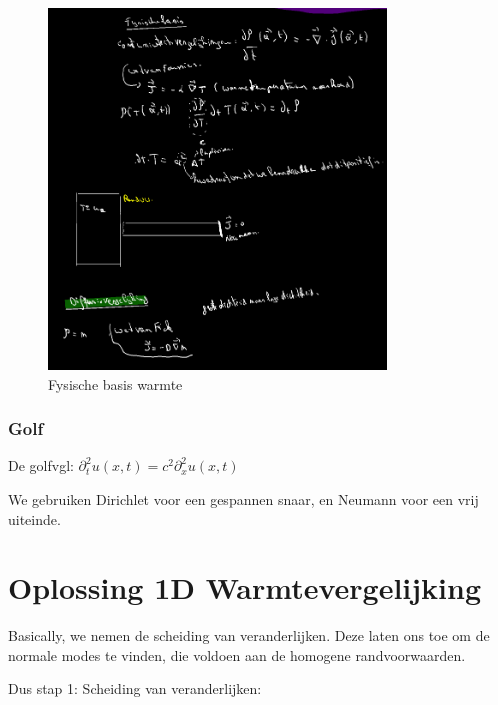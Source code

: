 \documentclass[a4paper]{report}
\begin{document}
\begin{figure}[H]
	\centering
	\includegraphics[width=0.8\textwidth]{assets/fysische_basis_warmte.png}
	\caption{Fysische basis warmte}
	\label{fig:fysische_basis_warmte}
\end{figure}

\subsubsection{Golf}

De golfvgl: $\partial_{t}^2 u(x, t) = c^2 \partial_{x}^2 u(x, t)$

We gebruiken Dirichlet voor een gespannen snaar, en Neumann voor een vrij uiteinde.

\section{Oplossing 1D Warmtevergelijking}

Basically, we nemen de scheiding van veranderlijken. Deze laten ons toe om de normale modes te vinden, die voldoen aan de homogene randvoorwaarden.

Dus stap 1: Scheiding van veranderlijken:
\end{document}
